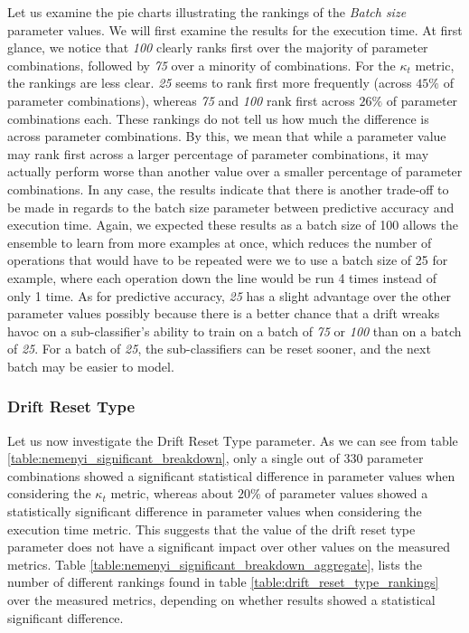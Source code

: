 Let us examine the pie charts illustrating the rankings of the \textit{Batch size} parameter values.
We will first examine the results for the execution time. At first glance, we notice that \textit{100} clearly ranks first over the majority of parameter combinations, followed by \textit{75} over a minority of combinations.
For the $\kappa_t$ metric, the rankings are less clear. \textit{25} seems to rank first more frequently (across $45\%$ of parameter combinations), whereas \textit{75} and \textit{100} rank first across $26\%$ of parameter combinations each. These rankings do not tell us how much the difference is across parameter combinations. By this, we mean that while a parameter value may rank first across a larger percentage of parameter combinations, it may actually perform worse than another value over a smaller percentage of parameter combinations.
In any case, the results indicate that there is another trade-off to be made in regards to the batch size parameter between predictive accuracy and execution time. Again, we expected these results as a batch size of 100 allows the ensemble to learn from more examples at once, which reduces the number of operations that would have to be repeated were we to use a batch size of 25 for example, where each operation down the line would be run 4 times instead of only 1 time. As for predictive accuracy, \textit{25} has a slight advantage over the other parameter values possibly because there is a better chance that a drift wreaks havoc on a sub-classifier's ability to train on a batch of \textit{75} or \textit{100} than on a batch of \textit{25}. For a batch of \textit{25}, the sub-classifiers can be reset sooner, and the next batch may be easier to model.

\subsubsection{Drift Reset Type}

Let us now investigate the Drift Reset Type parameter. As we can see from table \ref{table:nemenyi_significant_breakdown}, only a single out of 330 parameter combinations showed a significant statistical difference in parameter values when considering the $\kappa_t$ metric, whereas about $20\%$ of parameter values showed a statistically significant difference in parameter values when considering the execution time metric. This suggests that the value of the drift reset type parameter does not have a significant impact over other values on the measured metrics.
Table \ref{table:nemenyi_significant_breakdown_aggregate}, lists the number of different rankings found in table \ref{table:drift_reset_type_rankings} over the measured metrics, depending on whether results showed a statistical significant difference.

